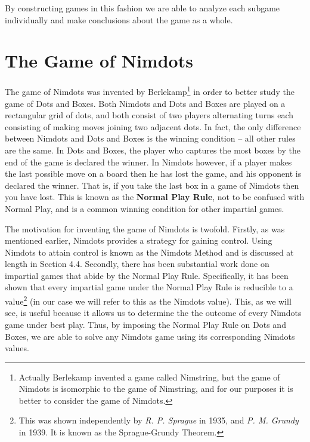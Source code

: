 \documentclass[12pt,twoside]{reedthesis}
\begin{document}
By constructing games in this fashion we are able to analyze each subgame individually and make conclusions about the game as a whole.


\section{The Game of Nimdots}
The game of Nimdots was invented by Berlekamp\footnote[2]{Actually Berlekamp invented a game called Nimstring, but the game of Nimdots is isomorphic to the game of Nimstring, and for our purposes it is better to consider the game of Nimdots.} in order to better study the game of Dots and Boxes.  Both Nimdots and Dots and Boxes are played on a rectangular grid of dots, and both consist of two players alternating turns each consisting of making moves joining two adjacent dots.  In fact, the only difference between Nimdots and Dots and Boxes is the winning condition -- all other rules are the same.  In Dots and Boxes, the player who captures the most boxes by the end of the game is declared the winner.  In Nimdots however, if a player makes the last possible move on a board then he has lost the game, and his opponent is declared the winner.  That is, if you take the last box in a game of Nimdots then you have lost.  This is known as the \textbf{Normal Play Rule}, not to be confused with Normal Play, and is a common winning condition for other impartial games. 

The motivation for inventing the game of Nimdots is twofold.  Firstly, as was mentioned earlier, Nimdots provides a strategy for gaining control.  Using Nimdots to attain control is known as the Nimdots Method and is discussed at length in Section 4.4.  Secondly, there has been substantial work done on impartial games that abide by the Normal Play Rule.  Specifically, it has been shown that every impartial game under the Normal Play Rule is reducible to a value\footnote[3]{This was shown independently by \emph{R. P. Sprague} in 1935, and \emph{P. M. Grundy} in 1939.  It is known as the Sprague-Grundy Theorem.} (in our case we will refer to this as the Nimdots value).  This, as we will see, is useful because it allows us to determine the the outcome of every Nimdots game under best play.  Thus, by imposing the Normal Play Rule on Dots and Boxes, we are able to solve any Nimdots game using its corresponding Nimdots values.
\end{document}

